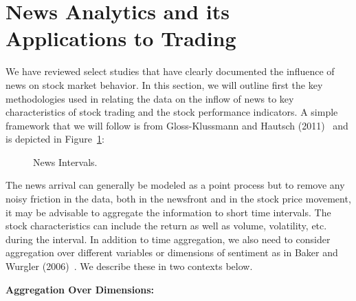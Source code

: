 \section{News Analytics and its Applications to Trading}

We have reviewed select studies that have clearly documented the influence of news on stock market behavior. In this section, we will outline first the key methodologies used in relating the data on the inflow of news to key characteristics of stock trading and the stock performance indicators. A simple framework that we will follow is from Gloss-Klussmann and Hautsch (2011)~\cite{klub} and is depicted in Figure~\ref{fig:intervals}:
	
	\begin{figure}[!ht]
	\centering
	\caption{News Intervals.\label{fig:intervals}}
	\end{figure}

The news arrival can generally be modeled as a point process but to remove any noisy friction in the data, both in the newsfront and in the stock price movement, it may be advisable to aggregate the information to short time intervals. The stock characteristics can include the return as well as volume, volatility, etc. during the interval. In addition to time aggregation, we also need to consider aggregation over different variables or dimensions of sentiment as in Baker and Wurgler (2006)~\cite{baker2006investor}. We describe these in two contexts below. \twomedskip


\noindent\textbf{Aggregation Over Dimensions:} \\


